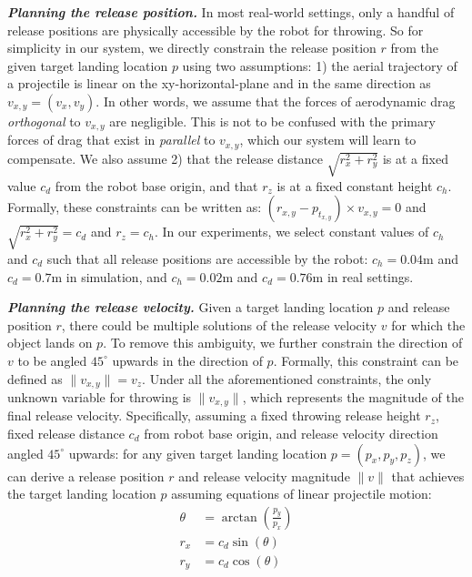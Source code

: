 \documentclass[journal]{IEEEtran}
\newcommand{\ie}{\textit{i}.\textit{e}., }
\newcommand{\mypara}[1]{\par\vspace*{0.8mm}\noindent\textbf{\textit{#1}}}
\begin{document}
\mypara{Planning the release position.} In most real-world settings, only a handful of release positions are physically accessible by the robot for throwing. So for simplicity in our system, we directly constrain the release position $r$ from the given target landing location $p$ using two assumptions: 1) the aerial trajectory of a projectile is linear on the xy-horizontal-plane and in the same direction as $v_{x,y}=(v_x,v_y)$. In other words, we assume that the forces of aerodynamic drag \textit{orthogonal} to $v_{x,y}$ are negligible. This is not to be confused with the primary forces of drag that exist in \textit{parallel} to $v_{x,y}$, which our system will learn to compensate. We also assume 2) that the release distance $\sqrt{r_x^2+r_y^2}$ is at a fixed value $c_d$ from the robot base origin, and that $r_z$ is at a fixed constant height $c_h$. Formally, these constraints can be written as: 
$(r_{x,y}-p_{t_{x,y}})\times{v_{x,y}}=0$
and $\sqrt{r_x^2+r_y^2} = c_d$ and $r_z=c_h$. 
In our experiments, we select constant values of $c_h$ and $c_d$ such that all release positions are accessible by the robot: $c_h=0.04$m and $c_d=0.7$m in simulation, and $c_h=0.02$m and $c_d=0.76$m in real settings. 

\mypara{Planning the release velocity.} Given a target landing location $p$ and release position $r$, there could be multiple solutions of the release velocity $v$ for which the object lands on $p$. To remove this ambiguity, we further constrain the direction of $v$ to be angled $45^\circ$ upwards in the direction of $p$. Formally, this constraint can be defined as $\|v_{x,y}\|=v_z$.
Under all the aforementioned constraints, the only unknown variable for throwing is $\|v_{x,y}\|$, which represents the magnitude of the final release velocity. %
Specifically, assuming a fixed throwing release height $r_z$, fixed release distance $c_d$ from robot base origin, and release velocity direction angled $45^\circ$ upwards: for any given target landing location $p=(p_x,p_y,p_z)$, we can derive a release position $r$ and release velocity magnitude $\|v\|$ that achieves the target landing location $p$ assuming equations of linear projectile motion: 
\begin{equation}
  \begin{split}
  \theta &= \arctan{(\frac{p_y}{p_x})}\\
  r_x &= c_d\sin(\theta)\\
  r_y &= c_d\cos(\theta)
  \end{split}
\end{equation}
\end{document}
